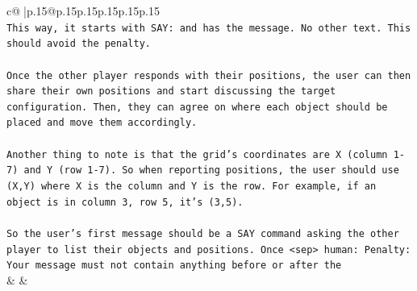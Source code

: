 \documentclass{article}
\begin{document}
{\begin{supertabular}{c@{$\;$}|p{.15\linewidth}@{}p{.15\linewidth}p{.15\linewidth}p{.15\linewidth}p{.15\linewidth}p{.15\linewidth}}
{{{\\ 
\texttt{This way, it starts with SAY: and has the message. No other text. This should avoid the penalty.} \\
\\ 
\texttt{Once the other player responds with their positions, the user can then share their own positions and start discussing the target configuration. Then, they can agree on where each object should be placed and move them accordingly.} \\
\\ 
\texttt{Another thing to note is that the grid's coordinates are X (column 1{-}7) and Y (row 1{-}7). So when reporting positions, the user should use (X,Y) where X is the column and Y is the row. For example, if an object is in column 3, row 5, it's (3,5).} \\
\\ 
\texttt{So the user's first message should be a SAY command asking the other player to list their objects and positions. Once <sep> human: Penalty: Your message must not contain anything before or after the} \\
            }
        }
    }
    & & \\ \\


\end{supertabular}}
\end{document}
